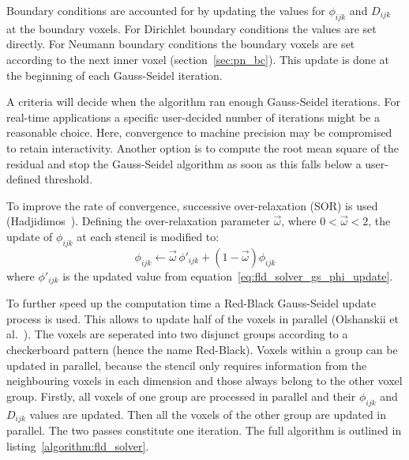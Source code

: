 Boundary conditions are accounted for by updating the values for $\phi_{ijk}$ and $D_{ijk}$ at the boundary voxels. For Dirichlet boundary conditions the values are set directly. For Neumann boundary conditions the boundary voxels are set according to the next inner voxel (section~\ref{sec:pn_bc}). This update is done at the beginning of each Gauss-Seidel iteration.

A criteria will decide when the algorithm ran enough Gauss-Seidel iterations. For real-time applications a specific user-decided number of iterations might be a reasonable choice. Here, convergence to machine precision may be compromised to retain interactivity. Another option is to compute the root mean square of the residual and stop the Gauss-Seidel algorithm as soon as this falls below a user-defined threshold.

To improve the rate of convergence, successive over-relaxation (SOR) is used (Hadjidimos~\cite{Hadjidimos00}). Defining the over-relaxation parameter $\vec{\omega}$, where $0<\vec{\omega}<2$, the update of $\phi_{ijk}$ at each stencil is modified to:
\begin{equation}
\label{eq:fld_solver_sor_update}
\phi_{ijk} \leftarrow \vec{\omega} \,\phi'_{ijk} + (1-\vec{\omega})\phi_{ijk} 
\end{equation}
where $\phi'_{ijk}$ is the updated value from equation~\ref{eq:fld_solver_gs_phi_update}.

To further speed up the computation time a Red-Black Gauss-Seidel update process is used. This allows to update half of the voxels in parallel (Olshanskii et al.~\cite{Olshanskii14}). The voxels are seperated into two disjunct groups according to a checkerboard pattern (hence the name Red-Black). Voxels within a group can be updated in parallel, because the stencil only requires information from the neighbouring voxels in each dimension and those always belong to the other voxel group. Firstly, all voxels of one group are processed in parallel and their $\phi_{ijk}$ and $D_{ijk}$ values are updated. Then all the voxels of the other group are updated in parallel. The two passes constitute one iteration. The full algorithm is outlined in listing~\ref{algorithm:fld_solver}.



